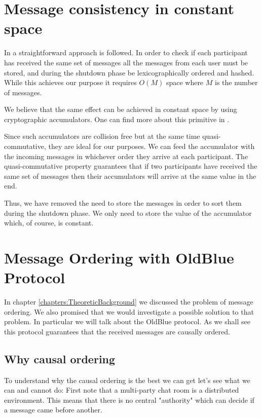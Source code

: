 \section{Message consistency in constant space}
In \cite{mpotr} a straightforward approach is followed. In order to check if
each participant has received the same set of messages all the messages from
each user must be stored, and during the shutdown phase be lexicographically
ordered and hashed. While this achieves our purpose it requires $O(M)$ space
where $M$ is the number of messages.

We believe that the same effect can be achieved in constant space by using
cryptographic accumulators. One can find more about this primitive in \cite{accum_def}.

Since such accumulators are collision free but at the same time quasi-commutative,
they are ideal for our purposes. We can feed the accumulator with the incoming
messages in whichever order they arrive at each participant. The quasi-commutative
property guarantees that if two participants have received the same set of messages
then their accumulators will arrive at the same value in the end.

Thus, we have removed the need to store the messages in order to sort them during
the shutdown phase. We only need to store the value of the accumulator which,
of course, is constant.

\section{Message Ordering with OldBlue Protocol}

In chapter \ref{chapters:TheoreticBackground} we discussed the problem of message ordering.
We also promised that we would investigate a possible solution to that problem.
In particular we will talk about the OldBlue protocol.
As we shall see this protocol guarantees that the received messages are causally ordered.

\subsection{Why causal ordering}

To understand why the causal ordering is the best we can get let's see what we can and cannot do:
First note that a multi-party chat room is a distributed environment.
This means that there is no central "authority" which can decide if a message came before another.

